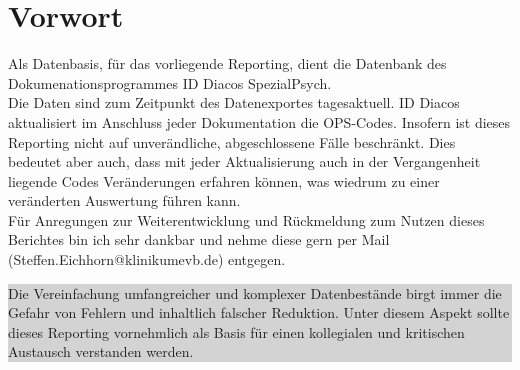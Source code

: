 \clearpage
\section{Vorwort}
Als Datenbasis, für das vorliegende Reporting, dient die Datenbank des Dokumenationsprogrammes ID Diacos SpezialPsych.\\

Die Daten sind zum Zeitpunkt des Datenexportes tagesaktuell. ID Diacos aktualisiert im Anschluss jeder Dokumentation die OPS-Codes. Insofern ist dieses Reporting nicht auf unverändliche, abgeschlossene Fälle beschränkt. Dies bedeutet aber auch, dass mit jeder Aktualisierung auch in der Vergangenheit liegende Codes Veränderungen erfahren können, was wiedrum zu einer veränderten Auswertung führen kann.\\

Für Anregungen zur Weiterentwicklung und Rückmeldung zum Nutzen dieses Berichtes bin ich sehr dankbar und nehme diese gern per Mail (Steffen.Eichhorn@klinikumevb.de) entgegen.
\vfill
\noindent
\colorbox{lightgray}{%
\begin{minipage}{1\linewidth-2\fboxsep-2\fboxrule}%
Die Vereinfachung umfangreicher und komplexer Datenbestände birgt immer die Gefahr von Fehlern und inhaltlich falscher Reduktion. Unter diesem Aspekt sollte dieses Reporting vornehmlich als Basis für einen kollegialen und kritischen Austausch verstanden werden.
\end{minipage}
}
\clearpage